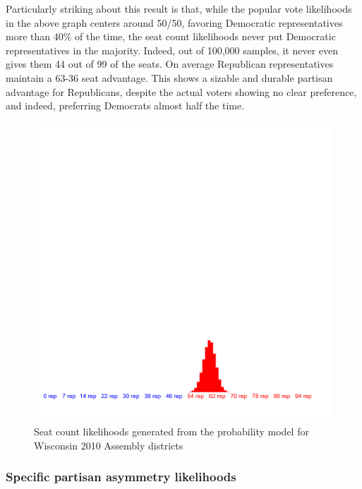 \documentclass[preprint,12pt]{article}
\begin{document}
Particularly striking about this result is that, while the popular vote likelihoods in the above graph centers around 50/50, favoring Democratic representatives more than 40\% of the time, the seat count likelihoods never put Democratic representatives in the majority.  Indeed, out of 100,000 samples, it never even gives them 44 out of 99 of the seats.  On average Republican representatives maintain a 63-36 seat advantage.   This shows a sizable and durable partisan advantage for Republicans, despite the actual voters showing no clear preference, and indeed, preferring Democrats almost half the time.

\begin{figure}[htb!]
    \begin{center}
        \includegraphics[scale=0.25]{../Figures/WI2010/seats.png}
        \caption{Seat count likelihoods generated from the probability model for Wisconsin 2010 Assembly districts}\label{fig:LikelihoodsSeatCounts}
    \end{center}
\end{figure}
 

\subsubsection{Specific partisan asymmetry likelihoods}
 
\end{document}
